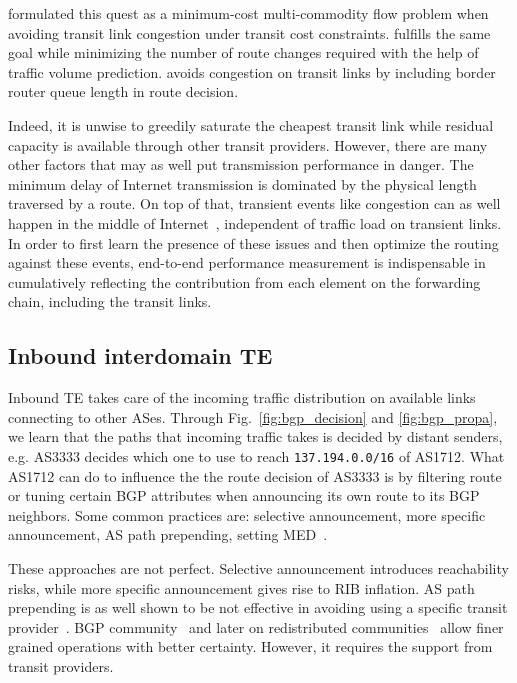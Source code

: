 \citet{Goldenberg2004} formulated this quest as a minimum-cost multi-commodity flow problem when avoiding transit link congestion under transit cost constraints.
\citet{Uhlig2004b} fulfills the same goal while minimizing the number of route changes required with the help of traffic volume prediction.
\citet{Zhu2014} avoids congestion on transit links by including border router queue length in route decision.

Indeed, it is unwise to greedily saturate the cheapest transit link while residual capacity is available through other transit providers.
However, there are many other factors that may as well put transmission performance in danger.
The minimum delay of Internet transmission is dominated by the physical length traversed by a route. 
On top of that, transient events like congestion can as well happen in the middle of Internet~\cite{Akella2003, Luckie2014}, independent of traffic load on transient links.
In order to first learn the presence of these issues and then optimize the routing against these events, end-to-end performance measurement is indispensable in cumulatively reflecting the contribution from each element on the forwarding chain, including the transit links.


\subsection{Inbound interdomain TE}
Inbound TE takes care of the incoming traffic distribution on available links connecting to other ASes.
Through Fig.~\ref{fig:bgp_decision} and \ref{fig:bgp_propa}, we learn that the paths that incoming traffic takes is decided by distant senders, e.g. AS3333 decides which one to use to reach \texttt{137.194.0.0/16} of AS1712.
What AS1712 can do to influence the the route decision of AS3333 is by 
filtering route or tuning certain BGP attributes when announcing its own route to its BGP neighbors.
Some common practices are: selective announcement, more specific announcement, AS path prepending, setting \ac{MED}~\cite{Wang2008}.

These approaches are not perfect. Selective announcement introduces reachability risks, while more specific announcement gives rise to \ac{RIB} inflation. AS path prepending is as well shown to be not effective in avoiding using a specific transit provider~\cite{Quoitin2004a}. BGP community~\cite{Donnet2008, Shao2015} and later on redistributed communities~\cite{Quoitin2002} allow finer grained operations with better certainty. However, it requires the support from transit providers. 

